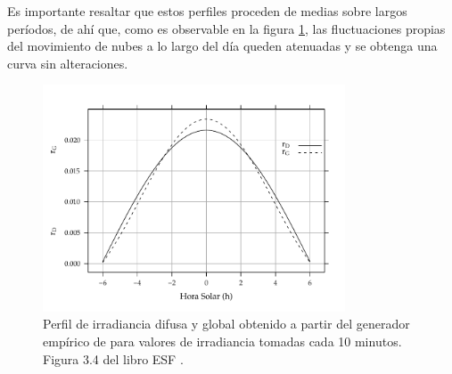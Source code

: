Es importante resaltar que estos perfiles proceden de medias sobre largos períodos, de ahí que, como es observable en la figura \ref{fig:org01d92e6}, las fluctuaciones propias del movimiento de nubes a lo largo del día queden atenuadas y se obtenga una curva sin alteraciones.
\begin{figure}[htbp]
\centering
\includegraphics[keepaspectratio,width=0.8\textwidth,height=0.5\textheight]{figuras/RgRd.pdf}
\caption{\label{fig:org01d92e6}Perfil de irradiancia difusa y global obtenido a partir del generador empírico de \cite{Collares-Pereira.Rabl1979} para valores de irradiancia tomadas cada 10 minutos. Figura 3.4 del libro ESF \cite{Perpinan2023}.}
\end{figure}


